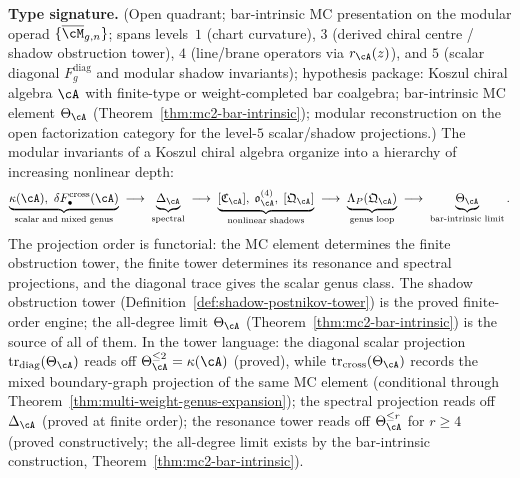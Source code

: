 \begin{theorem}
\label{thm:conditional-modular-characteristic-hierarchy}
\ClaimStatusConditional
\textbf{Type signature.} (Open quadrant; bar-intrinsic MC presentation
on the modular operad $\{\overline{\cM}_{g,n}\}$; spans levels~$1$
\textup{(}chart curvature\textup{)}, $3$ \textup{(}derived chiral
centre / shadow obstruction tower\textup{)}, $4$
\textup{(}line/brane operators via $r_\cA(z)$\textup{)}, and $5$
\textup{(}scalar diagonal $F_g^{\mathrm{diag}}$ and modular shadow
invariants\textup{)}; hypothesis package: Koszul chiral algebra $\cA$
with finite-type or weight-completed bar coalgebra; bar-intrinsic
MC element $\Theta_\cA$ \textup{(}Theorem~\ref{thm:mc2-bar-intrinsic}\textup{)};
modular reconstruction on the open factorization category for the
level-$5$ scalar/shadow projections.)
The modular invariants of a Koszul chiral algebra organize into
a hierarchy of increasing nonlinear depth:
\begin{equation}
\label{eq:conditional-modular-characteristic-hierarchy}
\underbrace{\kappa(\cA),\ \delta F_\bullet^{\mathrm{cross}}(\cA)}_{\text{scalar and mixed genus}}
\;\longrightarrow\;
\underbrace{\Delta_{\cA}}_{\text{spectral}}
\;\longrightarrow\;
\underbrace{[\mathfrak{C}_{\cA}],\;
\mathfrak{o}^{(4)}_{\cA},\;
[\mathfrak{Q}_{\cA}]}_{\text{nonlinear shadows}}
\;\longrightarrow\;
\underbrace{\Lambda_{P}(\mathfrak{Q}_{\cA})}_{\text{genus loop}}
\;\longrightarrow\;
\underbrace{\Theta_{\cA}}_{\text{bar-intrinsic limit}}.
\end{equation}
The projection order is functorial: the MC element determines the
finite obstruction tower, the finite tower determines its resonance
and spectral projections, and the diagonal trace gives the scalar
genus class. The shadow
obstruction tower
(Definition~\ref{def:shadow-postnikov-tower})
is the proved finite-order engine;
the all-degree limit $\Theta_{\cA}$
(Theorem~\ref{thm:mc2-bar-intrinsic}) is
the source of all of them.
In the tower language: the diagonal scalar projection
$\operatorname{tr}_{\mathrm{diag}}(\Theta_\cA)$ reads off
$\Theta_\cA^{\leq 2} = \kappa(\cA)$ (proved), while
$\operatorname{tr}_{\mathrm{cross}}(\Theta_\cA)$ records the mixed
boundary-graph projection of the same MC element (conditional through
Theorem~\ref{thm:multi-weight-genus-expansion}); the spectral
projection reads off $\Delta_\cA$ (proved at finite order); the
resonance tower reads off $\Theta_\cA^{\leq r}$ for
$r \geq 4$ (proved constructively; the all-degree limit exists
by the bar-intrinsic construction,
Theorem~\ref{thm:mc2-bar-intrinsic}).
\end{theorem}

